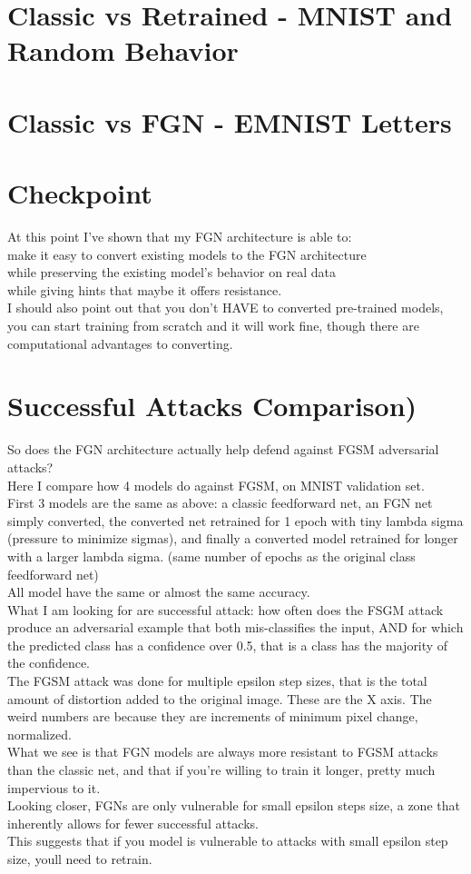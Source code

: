 \documentclass{article}
\begin{document}
\section{Classic vs Retrained - MNIST and Random Behavior}

\section{Classic vs FGN - EMNIST Letters}

\section{Checkpoint}
At this point I've shown that my FGN architecture is able to:\\
make it easy to convert existing models to the FGN architecture\\
while preserving the existing model's behavior on real data\\
while giving hints that maybe it offers resistance.\\
I should also point out that you don't HAVE to converted pre-trained models, you can start training from scratch and it will work fine, though there are computational advantages to converting.

\section{Successful Attacks Comparison)}
So does the FGN architecture actually help defend against FGSM adversarial attacks?\\
Here I compare how 4 models do against FGSM, on MNIST validation set.\\
First 3 models are the same as above: a classic feedforward net, an FGN net simply converted, the converted net retrained for 1 epoch with tiny lambda sigma (pressure to minimize sigmas), and finally a converted model retrained for longer with a larger lambda sigma. (same number of epochs as the original class feedforward net)\\
All model have the same or almost the same accuracy.\\
What I am looking for are successful attack: how often does the FSGM attack produce an adversarial example that both mis-classifies the input, AND for which the predicted class has a confidence over 0.5, that is a class has the majority of the confidence.\\
The FGSM attack was done for multiple epsilon step sizes, that is the total amount of distortion added to the original image. These are the X axis. The weird numbers are because they are increments of minimum pixel change, normalized.\\
What we see is that FGN models are always more resistant to FGSM attacks than the classic net, and that if you're willing to train it longer, pretty much impervious to it.\\
Looking closer, FGNs are only vulnerable for small epsilon steps size, a zone that inherently allows for fewer successful attacks.\\
This suggests that if you model is vulnerable to attacks with small epsilon step size, youll need to retrain.
\end{document}
